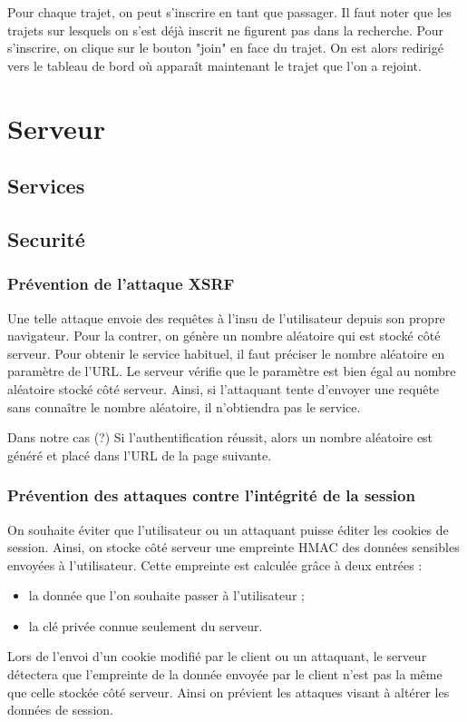 \documentclass[a4paper]{article}
\begin{document}
Pour chaque trajet, on peut s'inscrire en tant que passager. Il faut noter que les trajets sur lesquels on s'est déjà inscrit ne figurent
pas dans la recherche. Pour s'inscrire, on clique sur le bouton "join" en face du trajet. On est alors redirigé vers le tableau de bord
où apparaît maintenant le trajet que l'on a rejoint.

\section{Serveur}

	\subsection{Services}
	\subsection{Securité}
 		\subsubsection{Prévention de l'attaque XSRF}
 		
Une telle attaque envoie des requêtes à l'insu de l'utilisateur depuis son propre navigateur.
Pour la contrer, on génère un nombre aléatoire qui est stocké côté serveur.
Pour obtenir le service habituel, il faut préciser le nombre aléatoire en paramètre de l'URL.
Le serveur vérifie que le paramètre est bien égal au nombre aléatoire stocké côté serveur.
Ainsi, si l'attaquant tente d'envoyer une requête sans connaître le nombre aléatoire, il n'obtiendra
pas le service.

Dans notre cas (?)
Si l'authentification réussit, alors un nombre aléatoire est généré et placé dans l'URL de la page suivante.

   
 		
 		\subsubsection{Prévention des attaques contre l'intégrité de la session}
 		
On souhaite éviter que l'utilisateur ou un attaquant puisse éditer les cookies de session.
Ainsi, on stocke côté serveur une empreinte HMAC des données sensibles envoyées à l'utilisateur.
Cette empreinte est calculée grâce à deux entrées :
\begin{itemize}
	\item la donnée que l'on souhaite passer à l'utilisateur ;
	\item la clé privée connue seulement du serveur.
\end{itemize}
Lors de l'envoi d'un cookie modifié par le client ou un attaquant, le serveur détectera que l'empreinte
de la donnée envoyée par le client n'est pas la même que celle stockée côté serveur.
Ainsi on prévient les attaques visant à altérer les données de session.
\end{document}
